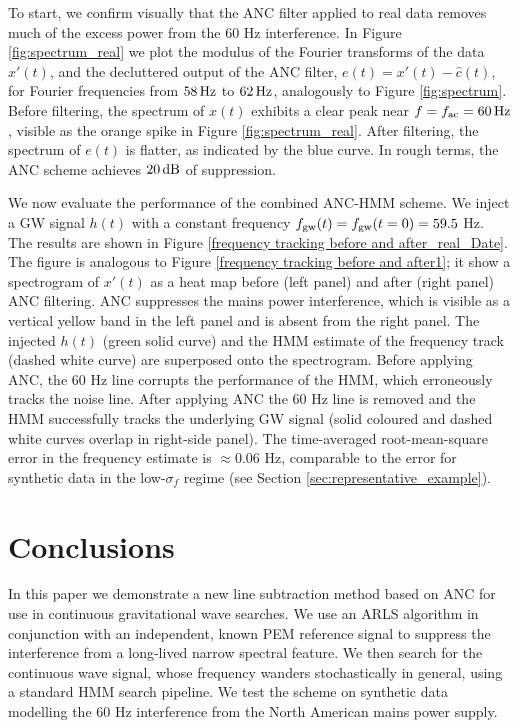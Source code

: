 \documentclass[pra,superscriptaddress,reprint,amsmath,amssymb,nofootinbib]{revtex4-2}
\begin{document}
To start, we confirm visually that the ANC filter applied to real data removes much of the excess power from the 60 Hz interference. In Figure \ref{fig:spectrum_real} we plot the modulus of the Fourier transforms of the  data $x'(t)$, and the decluttered output of the ANC filter, $e(t) = x'(t) - \hat{c}(t)$, for Fourier frequencies from $58 \, {\rm Hz}$ to $62 \, {\rm Hz}$, analogously to Figure \ref{fig:spectrum}. Before filtering, the spectrum of $x(t)$ exhibits a clear peak near $f = f_{\rm ac} = 60 \, {\rm Hz}$, visible as the orange spike in Figure \ref{fig:spectrum_real}. After filtering, the spectrum of $e(t)$ is flatter, as indicated by the blue curve. In rough terms, the ANC scheme achieves $20 \, {\rm dB}$ of suppression. \newline 


We now evaluate the performance of the combined ANC-HMM scheme. We inject a GW signal $h(t)$ with a constant frequency $f_{\rm gw}(t) = f_{\rm gw} (t=0) = 59.5 $ Hz. The results are shown in Figure \ref{frequency tracking before and after_real_Date}. The figure is analogous to Figure \ref{frequency tracking before and after1}; 
it show a spectrogram of $x'(t)$ as a heat map before (left panel) and after (right panel) ANC filtering. ANC suppresses the mains power interference, which is visible as a vertical yellow band in the left panel and is absent from the right panel. The injected $h(t)$ (green solid curve) and the HMM estimate of the frequency track (dashed white curve) are superposed onto the spectrogram. Before applying ANC, the 60 Hz line corrupts the performance of the HMM, which erroneously tracks the noise line. After applying ANC the 60 Hz line is removed and the HMM successfully tracks the underlying GW signal (solid coloured and dashed white curves overlap in right-side panel). The time-averaged root-mean-square error in the frequency estimate is $\approx 0.06$ Hz, comparable to the error for synthetic data in the low-$\sigma_f$ regime (see Section \ref{sec:representative_example}).






\section{Conclusions}\label{sec:conclusions}
In this paper we demonstrate a new line subtraction method based on ANC for use in continuous gravitational wave searches. We use an ARLS algorithm in conjunction with an independent, known PEM reference signal to suppress the interference from a long-lived narrow spectral feature. We then search for the continuous wave signal, whose frequency wanders stochastically in general, using a standard HMM search pipeline. We test the scheme on synthetic data modelling the 60 Hz interference from the North American mains power supply. \newline 
\end{document}
